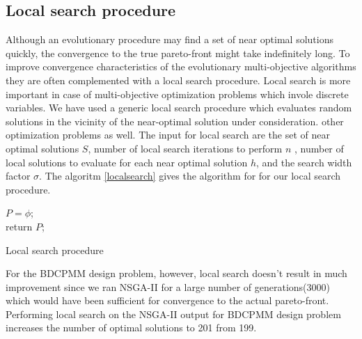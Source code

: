 \subsection{Local search procedure}
Although an evolutionary procedure may find a set of near optimal 
solutions quickly, the convergence to the true pareto-front might take 
indefinitely long. To improve convergence characteristics of the 
evolutionary multi-objective algorithms they are often complemented with
a local search procedure. Local search is more important in case of 
multi-objective optimization problems which invole discrete variables.
We have used a generic local search procedure which evaluates random 
solutions in the vicinity of the near-optimal solution under 
consideration. other optimization problems as well. The input for 
local search are the set of near optimal solutions $S$, number of 
local search iterations to perform $n$ , number of local solutions to 
evaluate for each near optimal solution $h$, and the search width 
factor $\sigma$. The algoritm \ref{localsearch} gives the algorithm 
for for our local search procedure.

\begin{algorithm}
$P = \phi$;\\
return $P$;
\BlankLine
\caption{Local search procedure}
\label{localsearch}
\end{algorithm}

For the BDCPMM design problem, however, local search doesn't result in 
much improvement since we ran NSGA-II for a large number of 
generations(3000) which would have been sufficient for convergence to
the actual pareto-front. Performing local search on the NSGA-II output
for BDCPMM design problem increases the number of optimal solutions 
to 201 from 199.

